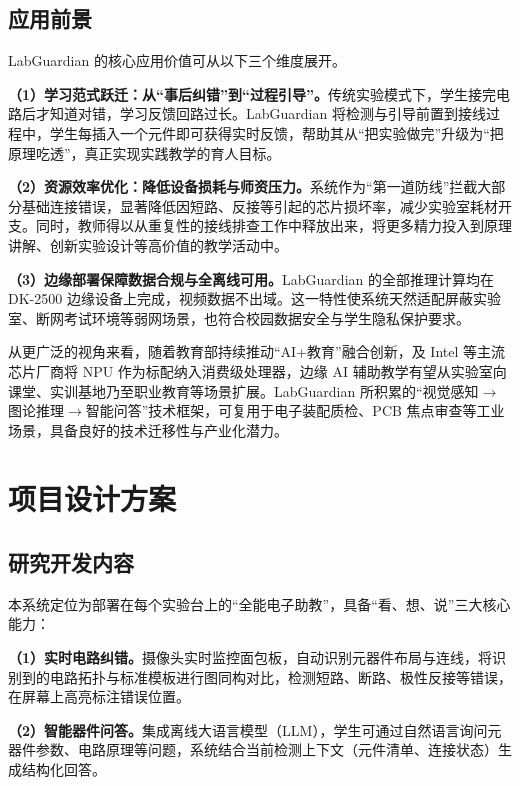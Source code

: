\documentclass[a4paper,12pt,fontset=ubuntu]{ctexart}
\begin{document}
\subsection{应用前景}

LabGuardian 的核心应用价值可从以下三个维度展开。

\textbf{（1）学习范式跃迁：从“事后纠错”到“过程引导”。}传统实验模式下，学生接完电路后才知道对错，学习反馈回路过长。LabGuardian 将检测与引导前置到接线过程中，学生每插入一个元件即可获得实时反馈，帮助其从“把实验做完”升级为“把原理吃透”，真正实现实践教学的育人目标。

\textbf{（2）资源效率优化：降低设备损耗与师资压力。}系统作为“第一道防线”拦截大部分基础连接错误，显著降低因短路、反接等引起的芯片损坏率，减少实验室耗材开支。同时，教师得以从重复性的接线排查工作中释放出来，将更多精力投入到原理讲解、创新实验设计等高价值的教学活动中。

\textbf{（3）边缘部署保障数据合规与全离线可用。}LabGuardian 的全部推理计算均在 DK-2500 边缘设备上完成，视频数据不出域。这一特性使系统天然适配屏蔽实验室、断网考试环境等弱网场景，也符合校园数据安全与学生隐私保护要求。

从更广泛的视角来看，随着教育部持续推动“AI+教育”融合创新，及 Intel 等主流芯片厂商将 NPU 作为标配纳入消费级处理器，边缘 AI 辅助教学有望从实验室向课堂、实训基地乃至职业教育等场景扩展。LabGuardian 所积累的“视觉感知$\rightarrow$图论推理$\rightarrow$智能问答”技术框架，可复用于电子装配质检、PCB 焦点审查等工业场景，具备良好的技术迁移性与产业化潜力。



\section{项目设计方案}
\label{sec:design}

\subsection{研究开发内容}

本系统定位为部署在每个实验台上的“全能电子助教”，具备“看、想、说”三大核心能力：

\textbf{（1）实时电路纠错。}摄像头实时监控面包板，自动识别元器件布局与连线，将识别到的电路拓扑与标准模板进行图同构对比，检测短路、断路、极性反接等错误，在屏幕上高亮标注错误位置。

\textbf{（2）智能器件问答。}集成离线大语言模型（LLM），学生可通过自然语言询问元器件参数、电路原理等问题，系统结合当前检测上下文（元件清单、连接状态）生成结构化回答。
\end{document}
